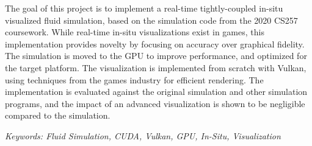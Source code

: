 The goal of this project is to implement a 
real-time tightly-coupled in-situ visualized fluid simulation, based on the simulation code from the 2020 CS257 coursework.
While real-time in-situ visualizations exist in games, this implementation provides novelty by focusing on accuracy over graphical fidelity.
The simulation is moved to the GPU to improve performance, and optimized for the target platform.
The visualization is implemented from scratch with Vulkan, using techniques from the games industry for efficient rendering.
The implementation is evaluated against the original simulation and other simulation programs, and the impact of an advanced visualization is shown to be negligible compared to the simulation.

\vspace{0.5cm}

\noindent \textit{Keywords: Fluid Simulation, CUDA, Vulkan, GPU, In-Situ, Visualization}